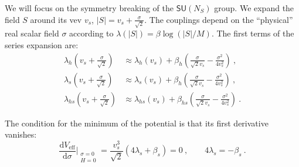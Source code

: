 \documentclass[aps,prd,preprintnumbers,nofootinbibn,twocolumn]{revtex4}
\newcommand{\dif}{\mathrm{d}}
\begin{document}
We will focus on the symmetry breaking of the $\mathsf{SU}(N_S)$ group. We expand the field $S$ around its vev $v_s$, $|S| = v_s + \frac{\sigma}{\sqrt{2}}$. The couplings depend on the ``physical'' real scalar field $\sigma$ according to $\lambda(|S|) = \beta \log(|S|/M)$. The first terms of the series expansion are:
\begin{subequations}
\begin{align}
\lambda_h\left(v_s + \frac{\sigma}{\sqrt{2}}\right) &\approx \lambda_h(v_s) + \beta_h \left(\frac{\sigma}{\sqrt{2}v_s}-\frac{\sigma^2}{4 v_s^2}\right)\ ,\\
\lambda_s\left(v_s + \frac{\sigma}{\sqrt{2}}\right) &\approx \lambda_s(v_s) + \beta_h \left(\frac{\sigma}{\sqrt{2}v_s}-\frac{\sigma^2}{4 v_s^2}\right)\ ,\\
\lambda_{hs}\left(v_s + \frac{\sigma}{\sqrt{2}}\right) &\approx \lambda_{hs}(v_s) + \beta_{hs} \left(\frac{\sigma}{\sqrt{2}v_s}-\frac{\sigma^2}{4 v_s^2}\right)\ .
\end{align}
\end{subequations}

The condition for the minimum of the potential is that its first derivative vanishes:
\begin{equation}
\frac{\dif V_\mathrm{eff}}{\dif \sigma}\Big|_{\substack{\sigma=0\\ H=0}} = \frac{v_s^3}{\sqrt{2}}(4\lambda_s + \beta_s) = 0\ ,  \qquad 4\lambda_s = - \beta_s \ . \label{eq:minimum}
\end{equation}
\end{document}
